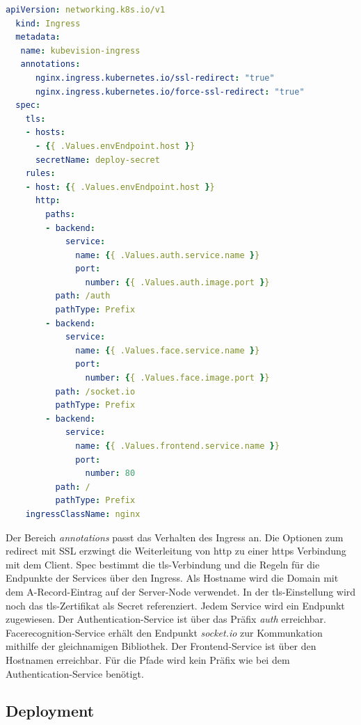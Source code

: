 \begin{lstlisting}[caption={kubevision-ingress.yaml},captionpos=b,label={lst:kubevisioningress},language=yaml]
  apiVersion: networking.k8s.io/v1
  kind: Ingress
  metadata:
   name: kubevision-ingress
   annotations:
      nginx.ingress.kubernetes.io/ssl-redirect: "true"
      nginx.ingress.kubernetes.io/force-ssl-redirect: "true"
  spec:
    tls:
    - hosts:
      - {{ .Values.envEndpoint.host }}
      secretName: deploy-secret
    rules:
    - host: {{ .Values.envEndpoint.host }}
      http:
        paths:
        - backend:
            service:
              name: {{ .Values.auth.service.name }}
              port:
                number: {{ .Values.auth.image.port }}
          path: /auth
          pathType: Prefix
        - backend:
            service:
              name: {{ .Values.face.service.name }}
              port:
                number: {{ .Values.face.image.port }}
          path: /socket.io
          pathType: Prefix
        - backend:
            service:
              name: {{ .Values.frontend.service.name }}
              port:
                number: 80
          path: /
          pathType: Prefix
    ingressClassName: nginx

\end{lstlisting}

Der Bereich \textit{annotations} passt das Verhalten des Ingress an.
Die Optionen zum redirect mit SSL erzwingt die Weiterleitung von \acs{http} zu einer \acs{https} Verbindung mit dem Client.
Spec bestimmt die \acs{tls}-Verbindung und die Regeln für die Endpunkte der Services über den Ingress.
Als Hostname wird die Domain mit dem A-Record-Eintrag auf der Server-Node verwendet.
In der \acs{tls}-Einstellung wird noch das \acs{tls}-Zertifikat als Secret referenziert.
Jedem Service wird ein Endpunkt zugewiesen.
Der Authentication-Service ist über das Präfix \textit{auth} erreichbar.
Facerecognition-Service erhält den Endpunkt \textit{socket.io} zur Kommunkation mithilfe der gleichnamigen Bibliothek.
Der Frontend-Service ist über den Hostnamen erreichbar.
Für die Pfade wird kein Präfix wie bei dem Authentication-Service benötigt.



\subsection{Deployment}


